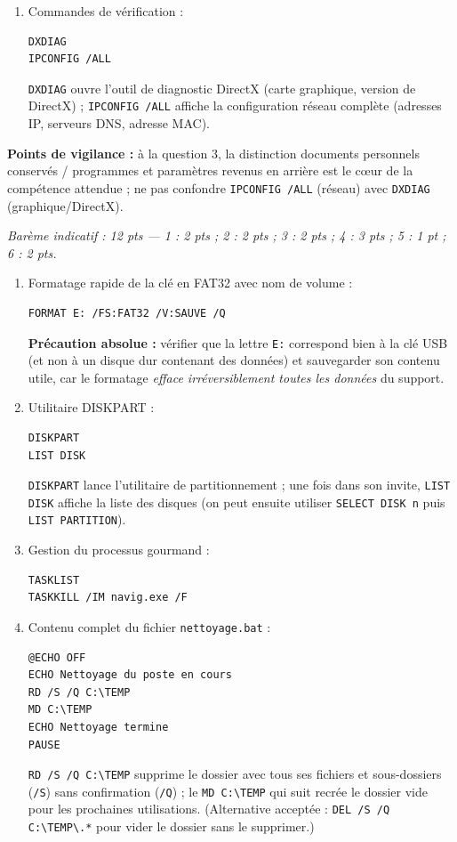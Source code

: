 \documentclass[11pt]{article}
\begin{document}
\begin{corrige}
\begin{enumerate}
  \item Commandes de vérification :
\begin{lstlisting}
DXDIAG
IPCONFIG /ALL
\end{lstlisting}
  \texttt{DXDIAG} ouvre l'outil de diagnostic DirectX (carte graphique, version de DirectX) ; \texttt{IPCONFIG /ALL} affiche la configuration réseau complète (adresses IP, serveurs DNS, adresse MAC).
\end{enumerate}
\textbf{Points de vigilance :} à la question 3, la distinction documents personnels conservés / programmes et paramètres revenus en arrière est le cœur de la compétence attendue ; ne pas confondre \texttt{IPCONFIG /ALL} (réseau) avec \texttt{DXDIAG} (graphique/DirectX).
\end{corrige}

\begin{corrige}
\emph{Barème indicatif : 12 pts — 1 : 2 pts ; 2 : 2 pts ; 3 : 2 pts ; 4 : 3 pts ; 5 : 1 pt ; 6 : 2 pts.}
\begin{enumerate}
  \item Formatage rapide de la clé en FAT32 avec nom de volume :
\begin{lstlisting}
FORMAT E: /FS:FAT32 /V:SAUVE /Q
\end{lstlisting}
  \textbf{Précaution absolue :} vérifier que la lettre \texttt{E:} correspond bien à la clé USB (et non à un disque dur contenant des données) et sauvegarder son contenu utile, car le formatage \emph{efface irréversiblement toutes les données} du support.
  \item Utilitaire DISKPART :
\begin{lstlisting}
DISKPART
LIST DISK
\end{lstlisting}
  \texttt{DISKPART} lance l'utilitaire de partitionnement ; une fois dans son invite, \texttt{LIST DISK} affiche la liste des disques (on peut ensuite utiliser \texttt{SELECT DISK n} puis \texttt{LIST PARTITION}).
  \item Gestion du processus gourmand :
\begin{lstlisting}
TASKLIST
TASKKILL /IM navig.exe /F
\end{lstlisting}
  \item Contenu complet du fichier \texttt{nettoyage.bat} :
\begin{lstlisting}
@ECHO OFF
ECHO Nettoyage du poste en cours
RD /S /Q C:\TEMP
MD C:\TEMP
ECHO Nettoyage termine
PAUSE
\end{lstlisting}
  \texttt{RD /S /Q C:\textbackslash TEMP} supprime le dossier avec tous ses fichiers et sous-dossiers (\texttt{/S}) sans confirmation (\texttt{/Q}) ; le \texttt{MD C:\textbackslash TEMP} qui suit recrée le dossier vide pour les prochaines utilisations. (Alternative acceptée : \texttt{DEL /S /Q C:\textbackslash TEMP\textbackslash *.*} pour vider le dossier sans le supprimer.)

\end{enumerate}
\end{corrige}
\end{document}

